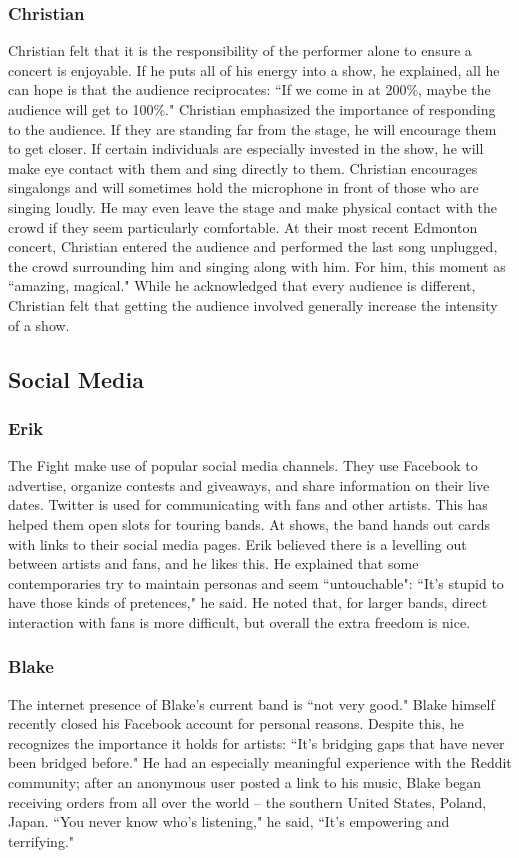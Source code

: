 \subsubsection{Christian}
Christian felt that it is the responsibility of the performer alone to ensure a concert is enjoyable. If he puts all of his energy into a show, he explained, all he can hope is that the audience reciprocates: ``If we come in at 200\%, maybe the audience will get to 100\%." Christian emphasized the importance of responding to the audience. If they are standing far from the stage, he will encourage them to get closer. If certain individuals are especially invested in the show, he will make eye contact with them and sing directly to them. Christian encourages singalongs and will sometimes hold the microphone in front of those who are singing loudly. He may even leave the stage and make physical contact with the crowd if they seem particularly comfortable. At their most recent Edmonton concert, Christian entered the audience and performed the last song unplugged, the crowd surrounding him and singing along with him. For him, this moment as ``amazing, magical." While he acknowledged that every audience is different, Christian felt that getting the audience involved generally increase the intensity of a show.

\subsection{Social Media}

\subsubsection{Erik}
The Fight make use of popular social media channels. They use Facebook to advertise, organize contests and giveaways, and share information on their live dates. Twitter is used for communicating with fans and other artists. This has helped them open slots for touring bands. At shows, the band hands out cards with links to their social media pages. Erik believed there is a levelling out between artists and fans, and he likes this. He explained that some contemporaries try to maintain personas and seem ``untouchable": ``It's stupid to have those kinds of pretences," he said. He noted that, for larger bands, direct interaction with fans is more difficult, but overall the extra freedom is nice.

\subsubsection{Blake}
The internet presence of Blake's current band is ``not very good." Blake himself recently closed his Facebook account for personal reasons. Despite this, he recognizes the importance it holds for artists: ``It's bridging gaps that have never been bridged before." He had an especially meaningful experience with the Reddit community; after an anonymous user posted a link to his music, Blake began receiving orders from all over the world -- the southern United States, Poland, Japan. ``You never know who's listening," he said, ``It's empowering and terrifying."


